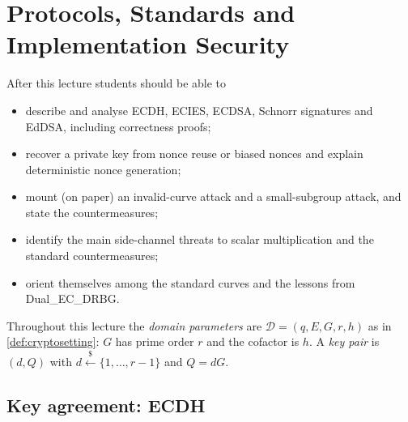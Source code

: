 \documentclass[11pt,a4paper,oneside]{book}
\theoremstyle{plain}
\theoremstyle{definition}
\theoremstyle{remark}
\newcommand{\sample}{\xleftarrow{\$}}
\begin{document}
\chapter{Protocols, Standards and Implementation Security}\label{ch:L4}

\begin{goalsbox}
After this lecture students should be able to
\begin{itemize}[nosep]
\item describe and analyse ECDH, ECIES, ECDSA, Schnorr signatures and EdDSA, including correctness proofs;
\item recover a private key from nonce reuse or biased nonces and explain deterministic nonce generation;
\item mount (on paper) an invalid-curve attack and a small-subgroup attack, and state the countermeasures;
\item identify the main side-channel threats to scalar multiplication and the standard countermeasures;
\item orient themselves among the standard curves and the lessons from Dual\_EC\_DRBG.
\end{itemize}
\end{goalsbox}

Throughout this lecture the \emph{domain parameters} are $\mathcal D=(q,E,G,r,h)$ as in \cref{def:cryptosetting}: $G$ has prime order $r$ and the cofactor is $h$. A \emph{key pair} is $(d,Q)$ with $d\sample\{1,\dots,r-1\}$ and $Q=dG$.

\section{Key agreement: ECDH}
\end{document}
